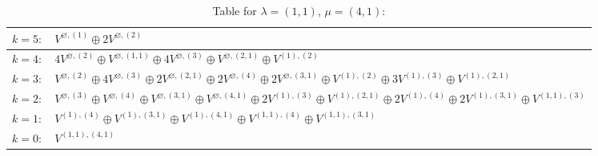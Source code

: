 \documentclass[a4paper,12pt]{article}
\begin{document}
\renewcommand{\arraystretch}{1.6} 
\begin{table}[H]
\centering
\caption{Table for $\lambda = (1, 1)$, $\mu = (4, 1)$:}
\begin{tabular}{|>{\centering\arraybackslash}p{15cm}|}
\hline
 $k = 5: \quad V^{\varnothing, (1)} \oplus 2 V^{\varnothing, (2)} $ \\ \hline
 $k = 4: \quad 4 V^{\varnothing, (2)} \oplus V^{\varnothing, (1, 1)} \oplus 4 V^{\varnothing, (3)} \oplus V^{\varnothing, (2, 1)} \oplus V^{(1), (2)} $ \\ \hline
 $k = 3: \quad V^{\varnothing, (2)} \oplus 4 V^{\varnothing, (3)} \oplus 2 V^{\varnothing, (2, 1)} \oplus 2 V^{\varnothing, (4)} \oplus 2 V^{\varnothing, (3, 1)} \oplus V^{(1), (2)} \oplus 3 V^{(1), (3)} \oplus V^{(1), (2, 1)} $ \\ \hline
 $k = 2: \quad V^{\varnothing, (3)} \oplus V^{\varnothing, (4)} \oplus V^{\varnothing, (3, 1)} \oplus V^{\varnothing, (4, 1)} \oplus 2 V^{(1), (3)} \oplus V^{(1), (2, 1)} \oplus 2 V^{(1), (4)} \oplus 2 V^{(1), (3, 1)} \oplus V^{(1, 1), (3)} $ \\ \hline
 $k = 1: \quad V^{(1), (4)} \oplus V^{(1), (3, 1)} \oplus V^{(1), (4, 1)} \oplus V^{(1, 1), (4)} \oplus V^{(1, 1), (3, 1)} $ \\ \hline
 $k = 0: \quad V^{(1, 1), (4, 1)} $ \\ \hline
\end{tabular}
\end{table}
\end{document}
